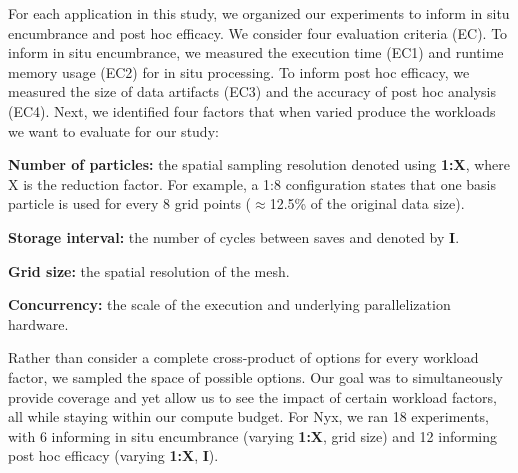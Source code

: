 For each application in this study, we organized our experiments to inform in situ encumbrance and post hoc efficacy. 
%
We consider four evaluation criteria (EC).
%
To inform in situ encumbrance,  we measured the execution time (EC1) and runtime memory usage (EC2) for in situ processing.
%
To inform post hoc efficacy, we measured the size of data artifacts (EC3) and the accuracy of post hoc analysis (EC4).
%
Next, we identified four factors that when varied produce the workloads we want to evaluate for our study:
\begin{tightItemize}
\item\textbf{Number of particles:} the spatial sampling resolution denoted using \textbf{1:X}, where X is the reduction factor. For example, a 1:8 configuration states that one basis particle is used for every 8 grid points ($\approx$12.5\% of the original data size).  
\item\textbf{Storage interval:} the number of cycles between saves and denoted by \textbf{I}.
\item\textbf{Grid size:} the spatial resolution of the mesh. 
\item\textbf{Concurrency:} the scale of the execution and underlying parallelization hardware.
\end{tightItemize}
%
%
Rather than consider a complete cross-product of options for every workload factor, we sampled the space of possible options.
%
Our goal was to simultaneously provide coverage and yet allow us to see the impact of certain workload factors, all while staying within our compute budget.
%
For Nyx, we ran 18 experiments, with 6 informing in situ encumbrance (varying \textbf{1:X}, grid size) and 12 informing post hoc efficacy (varying \textbf{1:X}, \textbf{I}).
